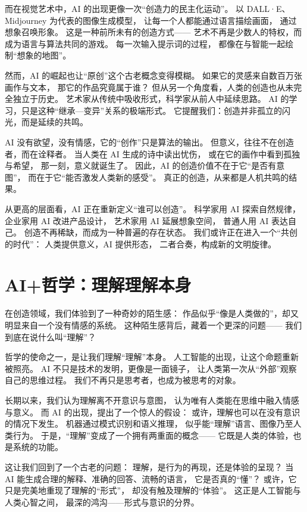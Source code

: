而在视觉艺术中，AI 的出现更像一次“创造力的民主化运动”。  
以 DALL·E、Midjourney 为代表的图像生成模型，  
让每一个人都能通过语言描绘画面，  
通过想象召唤形象。  
这是一种前所未有的创造方式——  
艺术不再是少数人的特权，而成为语言与算法共同的游戏。  
每一次输入提示词的过程，  
都像在与智能一起绘制“想象的地图”。

然而，AI 的崛起也让“原创”这个古老概念变得模糊。  
如果它的灵感来自数百万张画作与文本，  
那它的作品究竟属于谁？  
但从另一个角度看，人类的创造也从未完全独立于历史。  
艺术家从传统中吸收形式，科学家从前人中延续思路。  
AI 的学习，只是这种“继承—变异”关系的极端形式。  
它提醒我们：创造并非孤立的闪光，而是延续的共鸣。

AI 没有欲望，没有情感，它的“创作”只是算法的输出。  
但意义，往往不在创造者，而在诠释者。  
当人类在 AI 生成的诗中读出忧伤，  
或在它的画作中看到孤独与希望，  
那一刻，意义就诞生了。  
因此，AI 的创造价值不在于它“是否有意图”，  
而在于它“能否激发人类新的感受”。  
真正的创造，从来都是人机共鸣的结果。

从更高的层面看，AI 正在重新定义“谁可以创造”。  
科学家用 AI 探索自然规律，  
企业家用 AI 改进产品设计，  
艺术家用 AI 延展想象空间，  
普通人用 AI 表达自己。  
创造不再稀缺，而成为一种普遍的存在状态。  
我们或许正在进入一个“共创的时代”：  
人类提供意义，AI 提供形态，  
二者合奏，构成新的文明旋律。

\section{AI+哲学：理解理解本身}
在创造领域，我们体验到了一种奇妙的陌生感：  
作品似乎“像是人类做的”，却又明显来自一个没有情感的系统。  
这种陌生感背后，藏着一个更深的问题——  
我们到底在说什么叫“理解”？

哲学的使命之一，是让我们理解“理解”本身。  
人工智能的出现，让这个命题重新被照亮。  
AI 不只是技术的发明，更像是一面镜子，  
让人类第一次从“外部”观察自己的思维过程。  
我们不再只是思考者，也成为被思考的对象。

长期以来，我们认为理解离不开意识与意图，  
认为唯有人类能在思维中融入情感与意义。  
而 AI 的出现，提出了一个惊人的假设：  
或许，理解也可以在没有意识的情况下发生。  
机器通过模式识别和语义推理，  
似乎能“理解”语言、图像乃至人类行为。  
于是，“理解”变成了一个拥有两重面的概念——  
它既是人类的体验，也是系统的功能。

这让我们回到了一个古老的问题：  
理解，是行为的再现，还是体验的呈现？  
当 AI 能生成合理的解释、准确的回答、流畅的语言，  
它是否真的“懂”？  
或许，它只是完美地重现了理解的“形式”，  
却没有触及理解的“体验”。  
这正是人工智能与人类心智之间，  
最深的鸿沟——形式与意识的分界。

